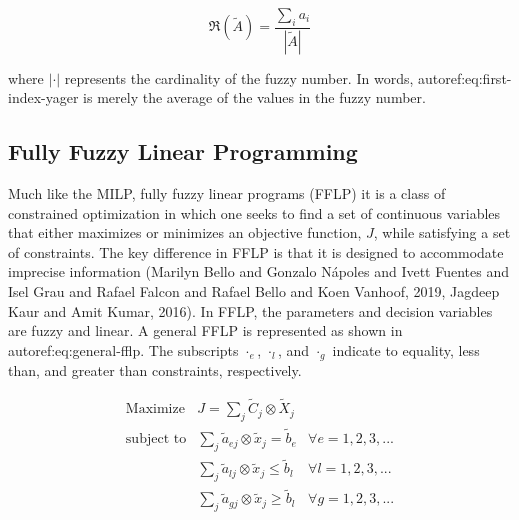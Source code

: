 \documentclass[11pt,a4paper,final]{article}
\begin{document}
\begin{equation}
\label{eq:first-index-yager}
\mathfrak{R}(\tilde{A}) = \frac{\sum_i a_i}{|\tilde{A}|}
\end{equation}

\noindent
where \(|\cdot|\) represents the cardinality of the fuzzy number. In words, autoref:eq:first-index-yager is merely the average
of the values in the fuzzy number.

\subsection{Fully Fuzzy Linear Programming}
\label{sec:orga7b71a3}
Much like the MILP, fully fuzzy linear programs (FFLP) it is a class of constrained optimization in which one seeks to
find a set of continuous variables that either maximizes or minimizes an objective function, \(J\), while satisfying a set
of constraints. The key difference in FFLP is that it is designed to accommodate imprecise information
(Marilyn Bello and Gonzalo N{\'a}poles and Ivett Fuentes and Isel Grau and Rafael Falcon and Rafael Bello and Koen Vanhoof, 2019, Jagdeep Kaur and Amit Kumar, 2016). In FFLP, the parameters and decision variables are fuzzy and
linear. A general FFLP is represented as shown in autoref:eq:general-fflp. The subscripts \(\cdot_e\), \(\cdot_l\), and \(\cdot_g\)
indicate to equality, less than, and greater than constraints, respectively.

\begin{equation}
\label{eq:general-fflp}
\begin{array}{lll}
\text{Maximize}   & J = \sum_j \tilde{C}_j \otimes \tilde{X}_j              &                 \\
\text{subject to} & \sum_j \tilde{a}_{ej} \otimes \tilde{x}_j = \tilde{b}_e &  \forall e = 1,2,3,... \\
                  & \sum_j \tilde{a}_{lj} \otimes \tilde{x}_j \le \tilde{b}_l &  \forall l = 1,2,3,... \\
                  & \sum_j \tilde{a}_{gj} \otimes \tilde{x}_j \ge \tilde{b}_l &  \forall g = 1,2,3,...
\end{array}
\end{equation}
\end{document}
